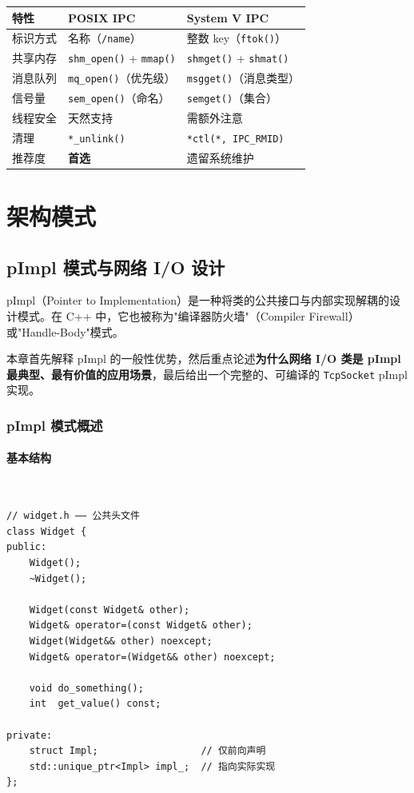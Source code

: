 \documentclass[12pt,a4paper,fontset=fandol]{ctexbook}
\newcommand{\Fn}[1]{\texttt{#1()}}
\newcommand{\Tp}[1]{\texttt{#1}}
\newcommand{\pimplabel}{%
  \noindent\begin{tcolorbox}[sharp corners,colback=pimplheadbg,colframe=pimplheadbg,
    left=6pt,right=6pt,top=2pt,bottom=2pt,boxrule=0pt]
  \textcolor{white}{\small\bfseries\sffamily pImpl}\end{tcolorbox}%
}
\begin{document}
\begin{compare}[title=POSIX IPC vs System V IPC]
\begin{tabularx}{\textwidth}{lXX}
\toprule
\textbf{特性} & \textbf{POSIX IPC} & \textbf{System V IPC} \\
\midrule
标识方式 & 名称（\Tp{/name}） & 整数 key（\Fn{ftok}） \\
共享内存 & \Fn{shm\_open} + \Fn{mmap} & \Fn{shmget} + \Fn{shmat} \\
消息队列 & \Fn{mq\_open}（优先级） & \Fn{msgget}（消息类型） \\
信号量 & \Fn{sem\_open}（命名） & \Fn{semget}（集合） \\
线程安全 & 天然支持 & 需额外注意 \\
清理 & \Tp{*\_unlink()} & \Tp{*ctl(*, IPC\_RMID)} \\
推荐度 & \textbf{首选} & 遗留系统维护 \\
\bottomrule
\end{tabularx}
\end{compare}

\part{架构模式}

\chapter{pImpl 模式与网络 I/O 设计}

pImpl（Pointer to Implementation）是一种将类的公共接口与内部实现解耦的设计模式。在 C++ 中，它也被称为"编译器防火墙"（Compiler Firewall）或"Handle-Body"模式。

本章首先解释 pImpl 的一般性优势，然后重点论述\textbf{为什么网络 I/O 类是 pImpl 最典型、最有价值的应用场景}，最后给出一个完整的、可编译的 \Tp{TcpSocket} pImpl 实现。

\section{pImpl 模式概述}

\subsection{基本结构}

\pimplabel
\begin{lstlisting}
// widget.h —— 公共头文件
class Widget {
public:
    Widget();
    ~Widget();

    Widget(const Widget& other);
    Widget& operator=(const Widget& other);
    Widget(Widget&& other) noexcept;
    Widget& operator=(Widget&& other) noexcept;

    void do_something();
    int  get_value() const;

private:
    struct Impl;                  // 仅前向声明
    std::unique_ptr<Impl> impl_;  // 指向实际实现
};
\end{lstlisting}
\end{document}
